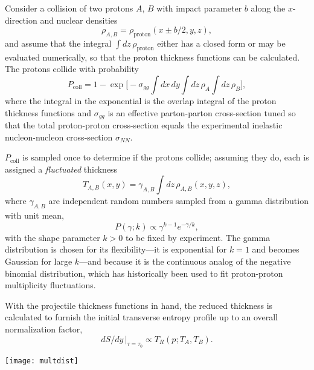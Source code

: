 \documentclass[aps,prc,reprint,amsmath,nofootinbib]{revtex4-1}
\newcommand{\trento}{T\raisebox{-.5ex}{R}ENTo}
\begin{document}
Consider a collision of two protons $A$, $B$ with impact parameter $b$ along the $x$-direction and nuclear densities
\begin{equation}
  \rho_{A,B} = \rho_\text{proton}(x \pm b/2, y, z),
\end{equation}
and assume that the integral $\int dz \, \rho_\text{proton}$ either has a closed form or may be evaluated numerically, so that the proton thickness functions can be calculated.
The protons collide with probability \cite{dEnterria:2010hd}
\begin{equation}
  P_\text{coll} = 1 - \exp\biggl[ -\sigma_{gg} \int dx \, dy \int dz \, \rho_A \int dz \, \rho_B \biggr],
  \label{eq:pcoll}
\end{equation}
where the integral in the exponential is the overlap integral of the proton thickness functions and
$\sigma_{gg}$ is an effective parton-parton cross-section tuned so that the total proton-proton
cross-section equals the experimental inelastic nucleon-nucleon cross-section $\sigma_{NN}$.

$P_\text{coll}$ is sampled once to determine if the protons collide; assuming they do, each is assigned a \emph{fluctuated} thickness
\begin{equation}
  T_{A,B}(x, y) = \gamma_{A,B} \int dz \, \rho_{A,B}(x, y, z),
\end{equation}
where $\gamma_{A,B}$ are independent random numbers sampled from a gamma distribution with unit mean,
\begin{equation}
  P(\gamma; k) \propto \gamma^{k-1} e^{-\gamma/k},
\end{equation}
with the shape parameter $k > 0$ to be fixed by experiment.  The gamma distribution is chosen for its
flexibility---it is exponential for $k = 1$ and becomes Gaussian for large $k$---and because it is the
continuous analog of the negative binomial distribution, which has historically been used to fit proton-proton
multiplicity fluctuations.

With the projectile thickness functions in hand, the reduced thickness is calculated to furnish the initial transverse entropy profile up to an overall normalization factor,
\begin{equation}
dS/dy \, |_{\tau = \tau_0} \propto T_R(p; T_A, T_B).
\end{equation}

\begin{figure*}[t]
  \texttt{[image: multdist]}
  \caption{
    \label{fig:multdist}
    Multiplicity distributions for proton-proton, proton-lead, and lead-lead collisions.  The blue histograms
    are \protect\trento\ results from $10^6$ minimum-bias events for each collision system, all with reduced
    thickness parameter $p = 0$ (geometric mean) and gamma fluctuation parameter $k = 0.8$.  The normalization
    constants indicated in the legends are tuned to match the experimental distributions
    (points with error bars) from ALICE \cite{}.
  }
\end{figure*}
\end{document}
